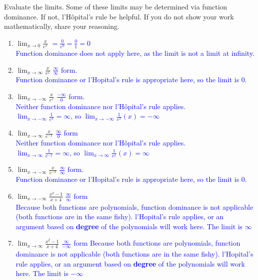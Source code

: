\documentclass{ximera}
\begin{document}
\begin{exercise}
    Evaluate the limits.  Some of these limits may be determined via function dominance.  If not, l'H\^opital's rule  be helpful.  If you do not show your work mathematically, share your reasoning.
\begin{enumerate}
    \item $\lim_{x\rightarrow 0} \frac{x}{e^x}$ \textcolor{blue}{ $=\frac{0}{e^0}=\frac01=0$ \\
Function dominance does not apply here, as the limit is not a limit at infinity.}
    \item $\lim_{x\rightarrow \infty} \frac{x}{e^x}$ \textcolor{blue}{ $\frac{\infty}{\infty}$ form.\\
    Function dominance or l'Hopital's rule is appropriate here, so the limit is $0$.}
    \item $\lim_{x\rightarrow -\infty} \frac{x}{e^x}$ \textcolor{blue}{ $\frac{-\infty}{0}$ form.\\
    Neither function dominance nor l'H\^opital's rule applies.\\
    $\lim_{x\rightarrow -\infty}\frac{1}{e^{x}}=\infty$, so $\lim_{x\rightarrow -\infty}\frac{1}{e^x}(x)=-\infty$  }
     \item $\lim_{x\rightarrow \infty} \frac{x}{e^{-x}}$ \textcolor{blue}{ $\frac{\infty}{0}$ form\\
     Neither function dominance nor l'H\^opital's rule applies.\\
     $\lim_{x\rightarrow \infty}\frac{1}{e^{-x}}=\infty$, so $\lim_{x\rightarrow \infty}\frac{1}{e^x}(x)=\infty$ }
    \item $\lim_{x\rightarrow -\infty} \frac{x}{e^{-x}}$ \textcolor{blue}{ $\frac{\infty}{\infty}$ form.\\
    Function dominance or l'Hopital's rule is appropriate here, so the limit is $0$.}
    \item $\lim_{x\rightarrow -\infty} \frac{x^2-1}{x+4}$ \textcolor{blue}{ $\frac{\infty}{\infty}$ form\\
    Because both functions are polynomials, function dominance is not applicable (both functions are in the same fishy).  l'Hopital's rule applies, or an argument based on \textbf{degree} of the polynomials will work here. The limit is $\infty$}
    \item $\lim_{x\rightarrow \infty} \frac{x^2-1}{x+4}$ \textcolor{blue}{ $\frac{\infty}{-\infty}$ form Because both functions are polynomials, function dominance is not applicable (both functions are in the same fishy).  l'Hopital's rule applies, or an argument based on \textbf{degree} of the polynomials will work here. The limit is $-\infty$}
\end{enumerate}   
\end{exercise}
  
\end{document}
